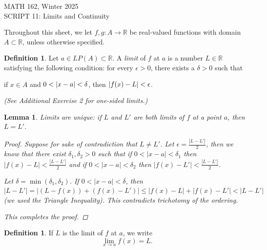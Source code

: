 \documentclass[11pt]{article}
\newcommand{\bbR}{\mathbb{R}}
\renewcommand{\_}[1]{\underline{ #1 }}
\DeclarePairedDelimiter{\abs}{\lvert}{\rvert}
\newcommand{\head}[1]{
	\begin{center}
		{\large #1}
		\vspace{.2 in}
	\end{center}
	
	\bigskip 
}
\newtheorem{lemma}[theorem]{Lemma}
\theoremstyle{definition}
\newtheorem{definition}[theorem]{Definition}
\numberwithin{equation}{subsection}
\begin{document}
\head{MATH 162, Winter 2025\\
SCRIPT 11: Limits and Continuity}

\setcounter{section}{11}
\setcounter{theorem}{0}

Throughout this sheet, we let $f, g\colon A \to \bbR$
be real-valued functions with domain $A \subset \bbR$, unless otherwise specified.

\begin{definition}
	Let $a \in LP(A) \subset \bbR$. A \emph{limit} of $f$ at $a$ is a number $L \in \bbR$ satisfying the following condition: for every $\epsilon > 0$, there exists a $\delta > 0$ such that
	\begin{center}
		if $x \in A$ and $0 < \abs{x - a} < \delta$, \quad then $\abs{f(x) - L} < \epsilon$.
	\end{center}
{\em (See Additional Exercise 2 for one-sided limits.)}
\end{definition}

\begin{lemma}
	Limits are unique: if $L$ and $L'$ are both limits of $f$ at a point $a$, then $L = L'$. 


\begin{proof}
Suppose for sake of contradiction that $L \neq L'$. Let $\epsilon = \frac{|L-L'|}{2}$, then we know that there exist $\delta_1, \delta_2 >0$ such that if $0<|x-a|<\delta_1$ then $|f(x)-L|<\frac{|L-L'|}{2}$ and if $0<|x-a|<\delta_2$ then $|f(x)-L'|<\frac{|L-L'|}{2}$.

Let $\delta = \min(\delta_1, \delta_2)$. If $0<|x-a|<\delta$, then $|L-L'|=|(L-f(x))+(f(x)-L')|\leq |f(x)-L| + |f(x)-L'|<|L-L'|$ (we used the Triangle Inequality). This contradicts trichotomy of the ordering. 

This completes the proof.

\renewcommand\qedsymbol{QED}
\end{proof}

    
\end{lemma}

\begin{definition}
	If $L$ is the limit of $f$ at $a$, we write
	\[
		\lim_{x \to a} f(x) = L.
	\]
\end{definition} 
\end{document}
